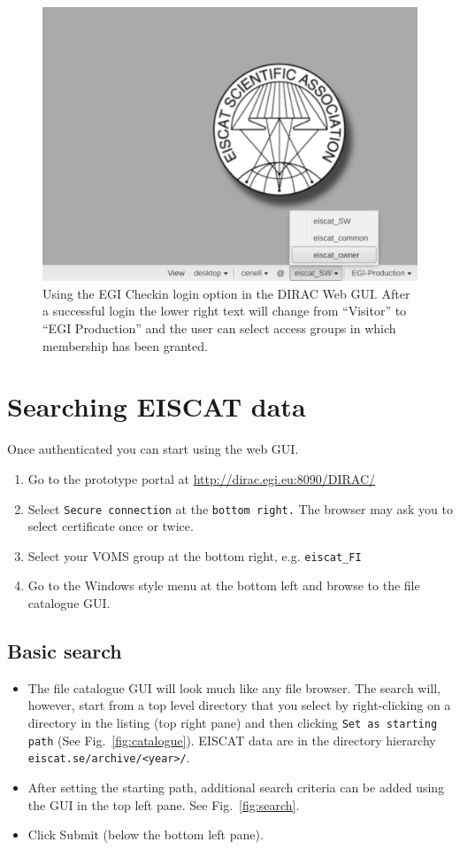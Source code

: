\documentclass[a4paper]{article}
\begin{document}
\begin{figure}[htb]
  \centering
  \includegraphics[width=0.5\linewidth]{dirac-gui-checkin-ok}
  \caption{Using the EGI Checkin login option in the DIRAC Web GUI. After a successful login the lower right text will change from ``Visitor'' to ``EGI Production'' and the user can select access groups in which membership has been granted.}
  \label{fig:checkin-succeeded}
\end{figure}


\section{Searching EISCAT data}
\label{sec:searching}

Once authenticated you can start using the web GUI.

\begin{enumerate}
\item Go to the prototype portal at \url{http://dirac.egi.eu:8090/DIRAC/}
\item Select \texttt{Secure connection} at the \texttt{bottom right.} The browser may ask you to select certificate once or twice.
\item Select your VOMS group at the bottom right, e.g. \texttt{eiscat\_FI}
\item Go to the Windows style menu at the bottom left and browse to the file catalogue GUI. 
\end{enumerate}

\subsection{Basic search}
\label{sec:searchdir}


\begin{itemize}
\item  The file catalogue GUI will look much like any file browser. The search will, however, start from a top level directory that you select by right-clicking on a directory in the listing (top right pane) and then clicking \texttt{Set as starting path} (See Fig.~\ref{fig:catalogue}). EISCAT data are in the directory hierarchy \texttt{eiscat.se/archive/<year>/}.
\item After setting the starting path, additional search criteria can be added using the GUI in the top left pane. See Fig.~\ref{fig:search}. 
\item Click Submit (below the bottom left pane). 
\end{itemize}
\end{document}
